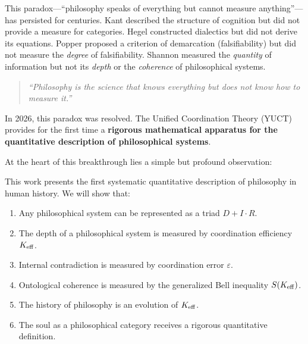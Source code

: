 \documentclass[12pt,a4paper]{article}
\newcommand{\eps}{\varepsilon}
\begin{document}
	This paradox—``philosophy speaks of everything but cannot measure anything''—has persisted for centuries. Kant described the structure of cognition but did not provide a measure for categories. Hegel constructed dialectics but did not derive its equations. Popper proposed a criterion of demarcation (falsifiability) but did not measure the \emph{degree} of falsifiability. Shannon measured the \emph{quantity} of information but not its \emph{depth} or the \emph{coherence} of philosophical systems.
	
	\begin{quote}
		\textit{``Philosophy is the science that knows everything but does not know how to measure it.''}
	\end{quote}
	
	In 2026, this paradox was resolved. The Unified Coordination Theory (YUCT) provides for the first time a \textbf{rigorous mathematical apparatus for the quantitative description of philosophical systems}.
	
	At the heart of this breakthrough lies a simple but profound observation:
	
	\begin{center}
	\end{center}
	
	This work presents the first systematic quantitative description of philosophy in human history. We will show that:
	
	\begin{enumerate}
		\item Any philosophical system can be represented as a triad \(D + I \cdot R\).
		\item The depth of a philosophical system is measured by coordination efficiency \(\Keff\).
		\item Internal contradiction is measured by coordination error \(\eps\).
		\item Ontological coherence is measured by the generalized Bell inequality \(S(\Keff)\).
		\item The history of philosophy is an evolution of \(\Keff\).
		\item The soul as a philosophical category receives a rigorous quantitative definition.
	\end{enumerate}
	
\end{document}
